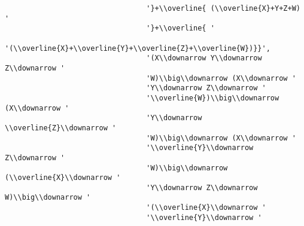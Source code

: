 \begin{verbatim}
                                 '}+\\overline{ (\\overline{X}+Y+Z+W) '
                                 '}+\\overline{ '
                                 '(\\overline{X}+\\overline{Y}+\\overline{Z}+\\overline{W})}}',
                                 '(X\\downarrow Y\\downarrow Z\\downarrow '
                                 'W)\\big\\downarrow (X\\downarrow '
                                 'Y\\downarrow Z\\downarrow '
                                 '\\overline{W})\\big\\downarrow (X\\downarrow '
                                 'Y\\downarrow \\overline{Z}\\downarrow '
                                 'W)\\big\\downarrow (X\\downarrow '
                                 '\\overline{Y}\\downarrow Z\\downarrow '
                                 'W)\\big\\downarrow (\\overline{X}\\downarrow '
                                 'Y\\downarrow Z\\downarrow W)\\big\\downarrow '
                                 '(\\overline{X}\\downarrow '
                                 '\\overline{Y}\\downarrow '

\end{verbatim}
